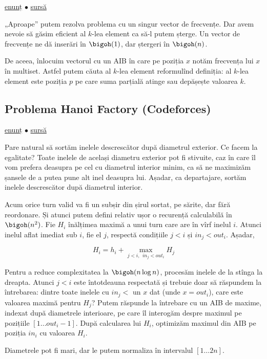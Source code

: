 \href{https://codeforces.com/contest/1354/problem/D}{enunț}
$\bullet$
\hyperref[code:multiset]{sursă}

„Aproape” putem rezolva problema cu un singur vector de frecvențe. Dar avem nevoie să găsim eficient al $k$-lea element ca să-l putem șterge. Un vector de frecvențe ne dă inserări în $\bigoh(1)$, dar ștergeri în $\bigoh(n)$.

De aceea, înlocuim vectorul cu un AIB în care pe poziția $x$ notăm frecvența lui $x$ în multiset. Astfel putem căuta al $k$-lea element reformulînd definiția: al $k$-lea element este poziția $p$ pe care suma parțială atinge sau depășește valoarea $k$.

\subsection{Problema Hanoi Factory (Codeforces)}
\label{problem:hanoi-factory}

\href{https://codeforces.com/contest/777/problem/E}{enunț}
$\bullet$
\hyperref[code:hanoi-factory]{sursă}

Pare natural să sortăm inelele descrescător după diametrul exterior. Ce facem la egalitate? Toate inelele de același diametru exterior pot fi stivuite, caz în care îl vom prefera deasupra pe cel cu diametrul interior minim, ca să ne maximizăm șansele de a putea pune alt inel deasupra lui. Așadar, ca departajare, sortăm inelele descrescător după diametrul interior.

Acum orice turn valid va fi un subșir din șirul sortat, pe sărite, dar fără reordonare. Și atunci putem defini relativ ușor o recurență calculabilă în $\bigoh(n^2)$. Fie $H_i$ înălțimea maximă a unui turn care are în vîrf inelul $i$. Atunci inelul aflat imediat sub $i$, fie el $j$, respectă condițiile $j < i$ și $in_j < out_i$. Așadar,

$$H_i = h_i + \max_{j < i,\ \ in_j < out_i} H_j$$

Pentru a reduce complexitatea la $\bigoh(n \log n)$, procesăm inelele de la stînga la dreapta. Atunci $j < i$ este întotdeauna respectată și trebuie doar să răspundem la întrebarea: dintre toate inelele cu $in_j < $ un $x$ dat (unde $x = out_i$), care este valoarea maximă pentru $H_j$? Putem răspunde la întrebare cu un AIB de maxime, indexat după diametrele interioare, pe care îl interogăm despre maximul pe pozițiile $[1 \dots out_i - 1]$. După calcularea lui $H_i$, optimizăm maximul din AIB pe poziția $in_i$ cu valoarea $H_i$.

Diametrele pot fi mari, dar le putem normaliza în intervalul $[1 \dots 2n]$.

